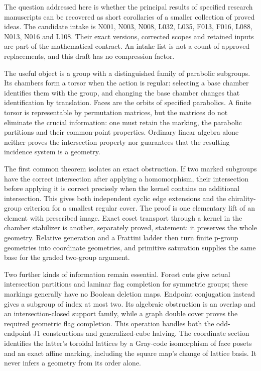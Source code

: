 \documentclass[
  10pt,
  letterpaper,
]{article}
\author{}
\date{}
\begin{document}
The question addressed here is whether the principal results of
specified research manuscripts can be recovered as short corollaries of
a smaller collection of proved ideas. The candidate intake is N001,
N003, N008, L032, L035, F013, F016, L088, N013, N016 and L108. Their
exact versions, corrected scopes and retained inputs are part of the
mathematical contract. An intake list is not a count of approved
replacements, and this draft has no compression factor.

The useful object is a group with a distinguished family of parabolic
subgroups. Its chambers form a torsor when the action is regular:
selecting a base chamber identifies them with the group, and changing
the base chamber changes that identification by translation. Faces are
the orbits of specified parabolics. A finite torsor is representable by
permutation matrices, but the matrices do not eliminate the crucial
information: one must retain the marking, the parabolic partitions and
their common-point properties. Ordinary linear algebra alone neither
proves the intersection property nor guarantees that the resulting
incidence system is a geometry.

The first common theorem isolates an exact obstruction. If two marked
subgroups have the correct intersection after applying a homomorphism,
their intersection before applying it is correct precisely when the
kernel contains no additional intersection. This gives both independent
cyclic edge extensions and the chirality-group criterion for a smallest
regular cover. The proof is one elementary lift of an element with
prescribed image. Exact coset transport through a kernel in the chamber
stabilizer is another, separately proved, statement: it preserves the
whole geometry. Relative generation and a Frattini ladder then turn
finite p-group geometries into coordinate geometries, and primitive
saturation supplies the same base for the graded two-group argument.

Two further kinds of information remain essential. Forest cuts give
actual intersection partitions and laminar flag completion for symmetric
groups; these markings generally have no Boolean deletion maps. Endpoint
conjugation instead gives a subgroup of index at most two. Its algebraic
obstruction is an overlap and an intersection-closed support family,
while a graph double cover proves the required geometric flag
completion. This operation handles both the odd-endpoint J1
constructions and generalized-cube halving. The coordinate section
identifies the latter's toroidal lattices by a Gray-code isomorphism of
face posets and an exact affine marking, including the square map's
change of lattice basis. It never infers a geometry from its order
alone.
\end{document}
